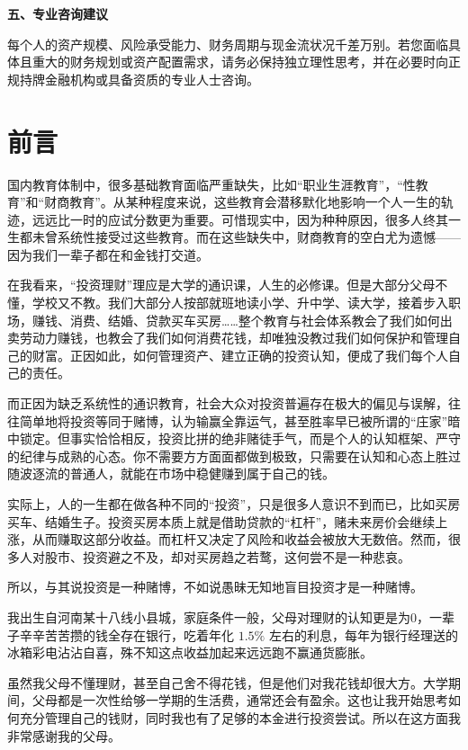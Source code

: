\documentclass[12pt,openany]{book}
\newcommand{\subhead}[1]{%
    \par\vspace{0.5\baselineskip}%
    \noindent\textbf{#1}\par%
    \vspace{0.5\baselineskip}%
}
\begin{document}
\subhead{五、专业咨询建议}
每个人的资产规模、风险承受能力、财务周期与现金流状况千差万别。若您面临具体且重大的财务规划或资产配置需求，请务必保持独立理性思考，并在必要时向正规持牌金融机构或具备资质的专业人士咨询。

\normalsize
\newpage

\begingroup
{}
\tableofcontents
\endgroup
\newpage

\chapter*{前言}

国内教育体制中，很多基础教育面临严重缺失，比如“职业生涯教育”，“性教育”和“财商教育”。从某种程度来说，这些教育会潜移默化地影响一个人一生的轨迹，远远比一时的应试分数更为重要。可惜现实中，因为种种原因，很多人终其一生都未曾系统性接受过这些教育。而在这些缺失中，财商教育的空白尤为遗憾——因为我们一辈子都在和金钱打交道。

在我看来，“投资理财”理应是大学的通识课，人生的必修课。但是大部分父母不懂，学校又不教。我们大部分人按部就班地读小学、升中学、读大学，接着步入职场，赚钱、消费、结婚、贷款买车买房……整个教育与社会体系教会了我们如何出卖劳动力赚钱，也教会了我们如何消费花钱，却唯独没教过我们如何保护和管理自己的财富。正因如此，如何管理资产、建立正确的投资认知，便成了我们每个人自己的责任。

而正因为缺乏系统性的通识教育，社会大众对投资普遍存在极大的偏见与误解，往往简单地将投资等同于赌博，认为输赢全靠运气，甚至胜率早已被所谓的“庄家”暗中锁定。但事实恰恰相反，投资比拼的绝非赌徒手气，而是个人的认知框架、严守的纪律与成熟的心态。你不需要方方面面都做到极致，只需要在认知和心态上胜过随波逐流的普通人，就能在市场中稳健赚到属于自己的钱。

实际上，人的一生都在做各种不同的“投资”，只是很多人意识不到而已，比如买房买车、结婚生子。投资买房本质上就是借助贷款的“杠杆”，赌未来房价会继续上涨，从而赚取这部分收益。而杠杆又决定了风险和收益会被放大无数倍。然而，很多人对股市、投资避之不及，却对买房趋之若鹜，这何尝不是一种悲哀。

所以，与其说投资是一种赌博，不如说愚昧无知地盲目投资才是一种赌博。

我出生自河南某十八线小县城，家庭条件一般，父母对理财的认知更是为$0$，一辈子辛辛苦苦攒的钱全存在银行，吃着年化 $1.5\%$ 左右的利息，每年为银行经理送的冰箱彩电沾沾自喜，殊不知这点收益加起来远远跑不赢通货膨胀。

虽然我父母不懂理财，甚至自己舍不得花钱，但是他们对我花钱却很大方。大学期间，父母都是一次性给够一学期的生活费，通常还会有盈余。这也让我开始思考如何充分管理自己的钱财，同时我也有了足够的本金进行投资尝试。所以在这方面我非常感谢我的父母。
\end{document}
